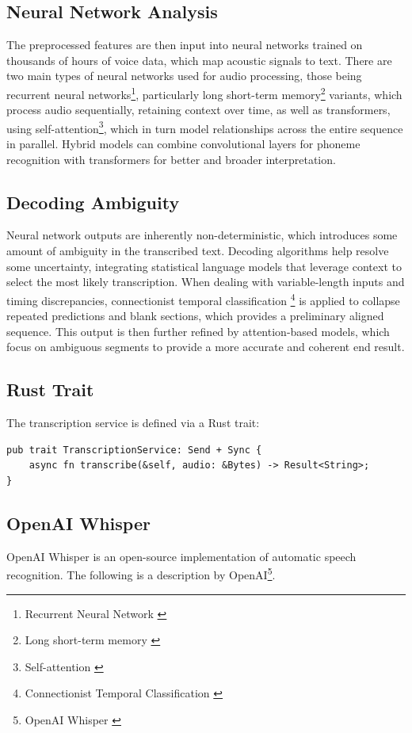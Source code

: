 \subsection{Neural Network Analysis}
The preprocessed features are then input into neural networks trained on thousands of hours of voice data,
which map acoustic signals to text.
There are two main types of neural networks used for audio processing,
those being recurrent neural networks\footnote{Recurrent Neural Network \cite{rnn}},
particularly long short-term memory\footnote{Long short-term memory \cite{lstm}} variants,
which process audio sequentially, retaining context over time,
as well as transformers, using self-attention\footnote{Self-attention \cite{self-attention}},
which in turn model relationships across the entire sequence in parallel.
Hybrid models can combine convolutional layers for phoneme recognition with transformers for better and broader interpretation.

\subsection{Decoding Ambiguity}
Neural network outputs are inherently non-deterministic, which introduces some amount of ambiguity in the transcribed text.
Decoding algorithms help resolve some uncertainty, integrating statistical language models
that leverage context to select the most likely transcription.
When dealing with variable-length inputs and timing discrepancies,
connectionist temporal classification \footnote{Connectionist Temporal Classification \cite{ctc}}
is applied to collapse repeated predictions and blank sections, which provides a preliminary aligned sequence.
This output is then further refined by attention-based models,
which focus on ambiguous segments to provide a more accurate and coherent end result.

\subsection{Rust Trait}
The transcription service is defined via a Rust trait:

\begin{verbatim}
pub trait TranscriptionService: Send + Sync {
    async fn transcribe(&self, audio: &Bytes) -> Result<String>;
}
\end{verbatim}

\subsection{OpenAI Whisper}
OpenAI Whisper is an open-source implementation of automatic speech recognition.
The following is a description by OpenAI\footnote{OpenAI Whisper \cite{whisper}}.

